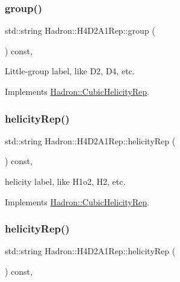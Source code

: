 \subsubsection{\texorpdfstring{group()}{group()}\hspace{0.1cm}{\footnotesize\ttfamily [5/5]}}
{\footnotesize\ttfamily std\+::string Hadron\+::\+H4\+D2\+A1\+Rep\+::group (\begin{DoxyParamCaption}{ }\end{DoxyParamCaption}) const\hspace{0.3cm}{\ttfamily [inline]}, {\ttfamily [virtual]}}

Little-\/group label, like D2, D4, etc. 

Implements \mbox{\hyperlink{structHadron_1_1CubicHelicityRep_a101a7d76cd8ccdad0f272db44b766113}{Hadron\+::\+Cubic\+Helicity\+Rep}}.

\mbox{\label{structHadron_1_1H4D2A1Rep_a64d7b12a9ed77971c31f5ce36e3b22bc}} 
\subsubsection{\texorpdfstring{helicityRep()}{helicityRep()}\hspace{0.1cm}{\footnotesize\ttfamily [1/3]}}
{\footnotesize\ttfamily std\+::string Hadron\+::\+H4\+D2\+A1\+Rep\+::helicity\+Rep (\begin{DoxyParamCaption}{ }\end{DoxyParamCaption}) const\hspace{0.3cm}{\ttfamily [inline]}, {\ttfamily [virtual]}}

helicity label, like H1o2, H2, etc. 

Implements \mbox{\hyperlink{structHadron_1_1CubicHelicityRep_af1096946b7470edf0a55451cc662f231}{Hadron\+::\+Cubic\+Helicity\+Rep}}.

\mbox{\label{structHadron_1_1H4D2A1Rep_a64d7b12a9ed77971c31f5ce36e3b22bc}} 
\subsubsection{\texorpdfstring{helicityRep()}{helicityRep()}\hspace{0.1cm}{\footnotesize\ttfamily [2/3]}}
{\footnotesize\ttfamily std\+::string Hadron\+::\+H4\+D2\+A1\+Rep\+::helicity\+Rep (\begin{DoxyParamCaption}{ }\end{DoxyParamCaption}) const\hspace{0.3cm}{\ttfamily [inline]}, {\ttfamily [virtual]}}

